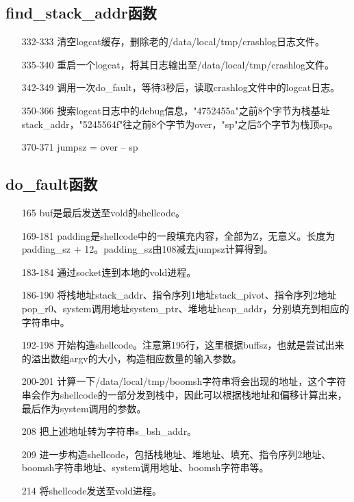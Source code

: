 \subsection{find\_stack\_addr函数}

\begin{itemize}
\item[332-333] 清空logcat缓存，删除老的/data/local/tmp/crashlog日志文件。
\item[335-340] 重启一个logcat，将其日志输出至/data/local/tmp/crashlog文件。
\item[342-349] 调用一次do\_fault，等待3秒后，读取crashlog文件中的logcat日志。
\item[350-366] 搜索logcat日志中的debug信息，"4752455a"之前8个字节为栈基址stack\_addr，"5245564f"往之前8个字节为over，"sp"之后5个字节为栈顶sp。
\item[370-371] jumpsz = over – sp
\end{itemize}

\subsection{do\_fault函数}

\begin{itemize}
\item[165] buf是最后发送至vold的shellcode。
\item[169-181] padding是shellcode中的一段填充内容，全部为Z，无意义。长度为padding\_sz + 12。padding\_sz由108减去jumpsz计算得到。
\item[183-184] 通过socket连到本地的vold进程。
\item[186-190] 将栈地址stack\_addr、指令序列1地址stack\_pivot、指令序列2地址pop\_r0、system调用地址system\_ptr、堆地址heap\_addr，分别填充到相应的字符串中。
\item[192-198] 开始构造shellcode。注意第195行，这里根据buffsz，也就是尝试出来的溢出数组argv的大小，构造相应数量的输入参数。
\item[200-201] 计算一下/data/local/tmp/boomsh字符串将会出现的地址，这个字符串会作为shellcode的一部分发到栈中，因此可以根据栈地址和偏移计算出来，最后作为system调用的参数。
\item[208] 把上述地址转为字符串s\_bsh\_addr。
\item[209] 进一步构造shellcode，包括栈地址、堆地址、填充、指令序列2地址、boomsh字符串地址、system调用地址、boomsh字符串等。
\item[214] 将shellcode发送至vold进程。
\end{itemize}

